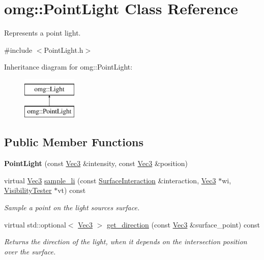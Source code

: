 \hypertarget{classomg_1_1_point_light}{}\section{omg\+::Point\+Light Class Reference}
\label{classomg_1_1_point_light}


Represents a point light.  




{\ttfamily \#include $<$Point\+Light.\+h$>$}

Inheritance diagram for omg\+::Point\+Light\+:\begin{figure}[H]
\begin{center}
\leavevmode
\includegraphics[height=2.000000cm]{classomg_1_1_point_light}
\end{center}
\end{figure}
\subsection*{Public Member Functions}
\begin{DoxyCompactItemize}
\item 
\mbox{\label{classomg_1_1_point_light_a1a78f905915bac18dfc917a20849fccc}} 
{\bfseries Point\+Light} (const \mbox{\hyperlink{namespaceomg_a45a9482677fee9933ff369b49894e316}{Vec3}} \&intensity, const \mbox{\hyperlink{namespaceomg_a45a9482677fee9933ff369b49894e316}{Vec3}} \&position)
\item 
\mbox{\label{classomg_1_1_point_light_aa77747811ae675d0f6140ca75ecbebda}} 
virtual \mbox{\hyperlink{namespaceomg_a45a9482677fee9933ff369b49894e316}{Vec3}} \mbox{\hyperlink{classomg_1_1_point_light_aa77747811ae675d0f6140ca75ecbebda}{sample\+\_\+li}} (const \mbox{\hyperlink{classomg_1_1_surface_interaction}{Surface\+Interaction}} \&interaction, \mbox{\hyperlink{namespaceomg_a45a9482677fee9933ff369b49894e316}{Vec3}} $\ast$wi, \mbox{\hyperlink{classomg_1_1_visibility_tester}{Visibility\+Tester}} $\ast$vt) const
\begin{DoxyCompactList}\small\item\em Sample a point on the light source\textquotesingle{}s surface. \end{DoxyCompactList}\item 
virtual std\+::optional$<$ \mbox{\hyperlink{namespaceomg_a45a9482677fee9933ff369b49894e316}{Vec3}} $>$ \mbox{\hyperlink{classomg_1_1_point_light_a064ca776b8304a2733bbe20619e071be}{get\+\_\+direction}} (const \mbox{\hyperlink{namespaceomg_a45a9482677fee9933ff369b49894e316}{Vec3}} \&surface\+\_\+point) const
\begin{DoxyCompactList}\small\item\em Returns the direction of the light, when it depends on the intersection position over the surface. \end{DoxyCompactList}\end{DoxyCompactItemize}
